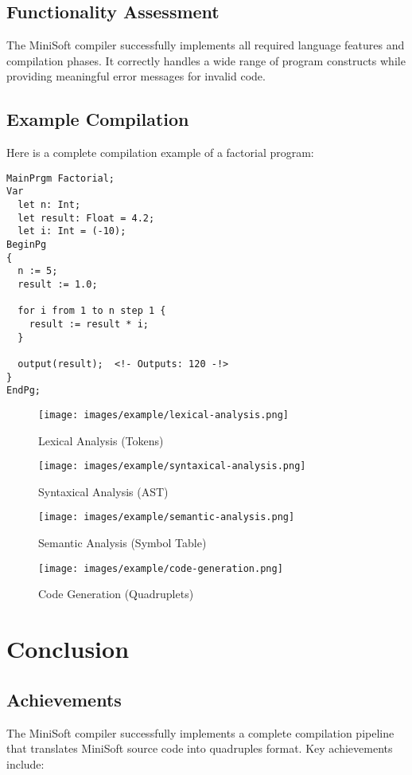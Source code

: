 \documentclass[12pt,a4paper]{article}
\begin{document}
\subsection{Functionality Assessment}
The MiniSoft compiler successfully implements all required language features and compilation phases. It correctly handles a wide range of program constructs while providing meaningful error messages for invalid code.

\subsection{Example Compilation}
Here is a complete compilation example of a factorial program:

\begin{lstlisting}[caption={Sample MiniSoft Program}]
MainPrgm Factorial;
Var
  let n: Int;
  let result: Float = 4.2;
  let i: Int = (-10);
BeginPg
{
  n := 5;
  result := 1.0;
  
  for i from 1 to n step 1 {
    result := result * i;
  }
  
  output(result);  <!- Outputs: 120 -!>
}
EndPg;
\end{lstlisting}

\begin{figure}[H]
	\centering
	\texttt{[image: images/example/lexical-analysis.png]}
	\caption{Lexical Analysis (Tokens)}
\end{figure}


\begin{figure}[H]
	\centering
	\texttt{[image: images/example/syntaxical-analysis.png]}
	\caption{Syntaxical Analysis (AST)}
\end{figure}

\begin{figure}[H]
	\centering
	\texttt{[image: images/example/semantic-analysis.png]}
	\caption{Semantic Analysis (Symbol Table)}
\end{figure}

\begin{figure}[H]
	\centering
	\texttt{[image: images/example/code-generation.png]}
	\caption{Code Generation (Quadruplets)}
\end{figure}

\section{Conclusion}
\subsection{Achievements}
The MiniSoft compiler successfully implements a complete compilation pipeline that translates MiniSoft source code into  quadruples format. Key achievements include:
\end{document}
